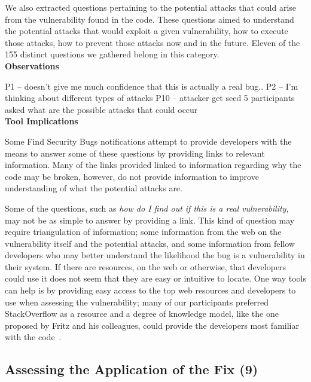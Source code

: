 \documentclass[conference]{IEEEtran}
\begin{document}
We also extracted questions pertaining to the potential attacks that could arise from the vulnerability found in the code. 
These questions aimed to understand the potential attacks that would exploit a given vulnerability, how to execute those attacks, how to prevent those attacks now and in the future. 
Eleven of the 155 distinct questions we gathered belong in this category.
\\

\noindent\textbf{Observations}

P1 -- doesn't give me much confidence that this is actually a real bug..
P2 -- I'm thinking about different types of attacks 
P10 -- attacker get seed
5 participants asked what are the possible attacks that could occur
\\

\noindent\textbf{Tool Implications}

Some Find Security Bugs notifications attempt to provide developers with the means to answer some of these questions by providing links to relevant information. 
Many of the links provided linked to information regarding why the code may be broken, however, do not provide information to improve understanding of what the potential attacks are.  

Some of the questions, such as \textit{how do I find out if this is a real vulnerability}, may not be as simple to answer by providing a link. 
This kind of question may require triangulation of information; some information from the web on the vulnerability itself and the potential attacks, and some information from fellow developers who may better understand the likelihood the bug is a vulnerability in their system. 
If there are resources, on the web or otherwise, that developers could use it does not seem that they are easy or intuitive to locate. 
One way tools can help is by providing easy access to the top web resources and developers to use when assessing the vulnerability; many of our participants preferred StackOverflow as a resource and a degree of knowledge model, like the one proposed by Fritz and his colleagues, could provide the developers most familiar with the code~\cite{fritz2010degree}.



\noindent\subsection{\textbf{Assessing the Application of the Fix (9)}}\label{aaf}
\end{document}
